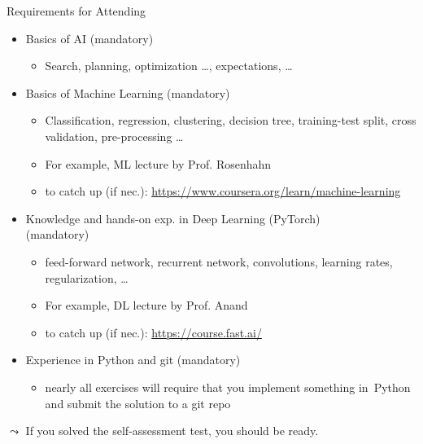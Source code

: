 \documentclass[aspectratio=169]{./latex_main/tntbeamer}  %
\begin{document}
\begin{frame}[c]{Requirements for Attending}
	
	\begin{itemize}
		\item Basics of \alert{AI} (mandatory)
		\begin{itemize}
			\item Search, planning, optimization \ldots, expectations, \ldots
		\end{itemize}
		\pause
		\item Basics of \alert{Machine Learning} (mandatory)
		\begin{itemize}
			\item Classification, regression, clustering, decision tree, training-test split, cross validation, pre-processing \ldots
			\item For example, ML lecture by Prof. Rosenhahn
			\item to catch up (if nec.):
			\url{https://www.coursera.org/learn/machine-learning} 
		\end{itemize}
		\pause
		\item Knowledge and hands-on exp. in \alert{Deep Learning} (PyTorch)\\ (mandatory)
		\begin{itemize}
			\item feed-forward network, recurrent network, convolutions, learning rates, regularization, \ldots 
			\item For example, DL lecture by Prof. Anand
			\item to catch up (if nec.): \url{https://course.fast.ai/}
		\end{itemize}
		\pause
		\item Experience in \alert{Python and git} (mandatory)
		\begin{itemize}
			\item nearly all exercises will require 
			that you implement something in~Python and submit the solution to a git repo
		\end{itemize}
	\end{itemize}
	\pause
	$\leadsto$ If you solved the self-assessment test, you should be ready.
	
\end{frame}
\end{document}
